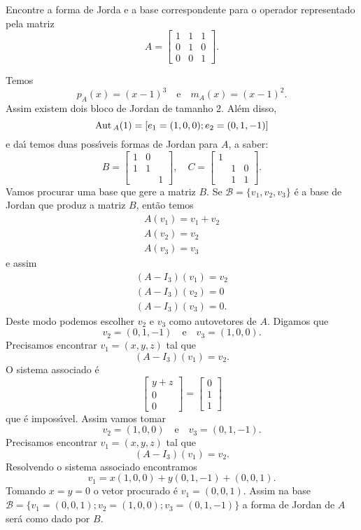 \begin{enumerate}
	Encontre a forma de Jorda e a base correspondente para o operador representado pela matriz
	\[
		A = \begin{bmatrix}
			1 & 1 & 1\\
			0 & 1 & 0\\
			0 & 0 & 1
		\end{bmatrix}.
	\]
	\begin{solucao}
		Temos
		\[
			p_A(x) = (x - 1)^3 \quad \mbox{e}\quad m_A(x) = (x - 1)^2.
		\]
		Assim existem dois bloco de Jordan de tamanho 2. Al\'em disso,
		\[
			{\rm Aut\,}_A(1) = [e_1 = (1,0,0); e_2 = (0,1,-1)]
		\]
		e da{\'\i} temos duas poss{\'\i}veis formas de Jordan para $A$, a saber:
		\[
			B = \begin{bmatrix}
				1 & 0 &\\
				1 & 1 &\\
				& & 1
			\end{bmatrix},\quad
			C = \begin{bmatrix}
				 1 &  &\\
				 & 1 & 0\\
				 & 1 & 1
			\end{bmatrix}.
		\]
		Vamos procurar uma base que gere a matriz $B$. Se $\mathcal{B} = \{v_1, v_2, v_3\}$ \'e a base de Jordan que produz a matriz $B$, ent\~ao temos
		\begin{align*}
			A(v_1) = v_1 + v_2\\
			A(v_2) = v_2\\
			A(v_3) = v_3
		\end{align*}
		e assim
		\begin{align*}
			(A - I_3)(v_1) = v_2\\
			(A - I_3)(v_2) = 0\\
			(A - I_3)(v_3) = 0.
		\end{align*}
		Deste modo podemos escolher $v_2$ e $v_3$ como autovetores de $A$. Digamos que
		\[
			v_2 = (0,1,-1) \quad \mbox{e} \quad v_3 = (1,0,0).
		\]
		Precisamos encontrar $v_1 = (x,y,z)$ tal que
		\[
			(A - I_3)(v_1) = v_2.
		\]
		O sistema associado \'e
		\[
			\begin{bmatrix}
				y + z\\
				0\\
				0
			\end{bmatrix} = \begin{bmatrix}
				0\\
				1\\
				1
			\end{bmatrix}
		\]
		que \'e imposs{\'\i}vel. Assim vamos tomar
		\[
			v_2 = (1,0,0) \quad \mbox{e} \quad v_3 = (0,1,-1).
		\]
		Precisamos encontrar $v_1 = (x,y,z)$ tal que
		\[
			(A - I_3)(v_1) = v_2.
		\]
		Resolvendo o sistema associado encontramos
		\[
				v_1 = x(1,0,0) + y(0,1,-1) + (0,0,1).
		\]
		Tomando $x = y = 0$ o vetor procurado \'e $v_1 = (0,0,1)$. Assim na base $\mathcal{B} = \{v_1 = (0,0,1); v_2 = (1,0,0); v_3 = (0,1,-1)\}$ a forma de Jordan de $A$ ser\'a como dado por $B$.


\end{solucao}
\end{enumerate}
